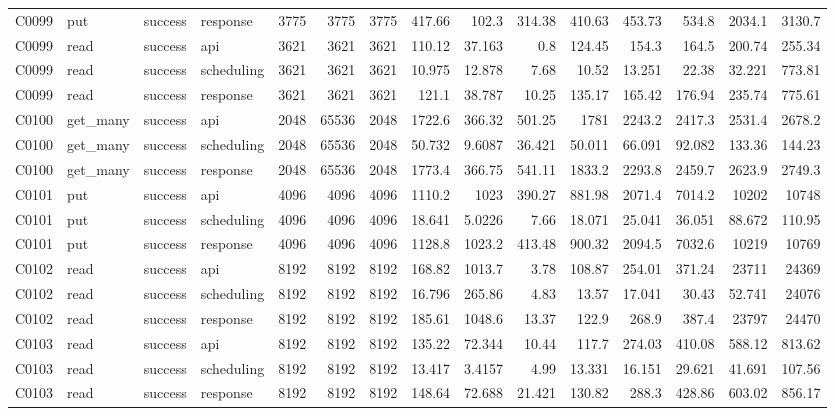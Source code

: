 \begin{landscape}
\begin{longtable}{llllrrrrrrrrrrr}
C0099 & put & success & response & 3775 & 3775 & 3775 & 417.66 & 102.3 & 314.38 & 410.63 & 453.73 & 534.8 & 2034.1 & 3130.7\\
C0099 & read & success & api & 3621 & 3621 & 3621 & 110.12 & 37.163 & 0.8 & 124.45 & 154.3 & 164.5 & 200.74 & 255.34\\
C0099 & read & success & scheduling & 3621 & 3621 & 3621 & 10.975 & 12.878 & 7.68 & 10.52 & 13.251 & 22.38 & 32.221 & 773.81\\
C0099 & read & success & response & 3621 & 3621 & 3621 & 121.1 & 38.787 & 10.25 & 135.17 & 165.42 & 176.94 & 235.74 & 775.61\\
C0100 & get\_\allowbreak{}many & success & api & 2048 & 65536 & 2048 & 1722.6 & 366.32 & 501.25 & 1781 & 2243.2 & 2417.3 & 2531.4 & 2678.2\\
C0100 & get\_\allowbreak{}many & success & scheduling & 2048 & 65536 & 2048 & 50.732 & 9.6087 & 36.421 & 50.011 & 66.091 & 92.082 & 133.36 & 144.23\\
C0100 & get\_\allowbreak{}many & success & response & 2048 & 65536 & 2048 & 1773.4 & 366.75 & 541.11 & 1833.2 & 2293.8 & 2459.7 & 2623.9 & 2749.3\\
C0101 & put & success & api & 4096 & 4096 & 4096 & 1110.2 & 1023 & 390.27 & 881.98 & 2071.4 & 7014.2 & 10202 & 10748\\
C0101 & put & success & scheduling & 4096 & 4096 & 4096 & 18.641 & 5.0226 & 7.66 & 18.071 & 25.041 & 36.051 & 88.672 & 110.95\\
C0101 & put & success & response & 4096 & 4096 & 4096 & 1128.8 & 1023.2 & 413.48 & 900.32 & 2094.5 & 7032.6 & 10219 & 10769\\
C0102 & read & success & api & 8192 & 8192 & 8192 & 168.82 & 1013.7 & 3.78 & 108.87 & 254.01 & 371.24 & 23711 & 24369\\
C0102 & read & success & scheduling & 8192 & 8192 & 8192 & 16.796 & 265.86 & 4.83 & 13.57 & 17.041 & 30.43 & 52.741 & 24076\\
C0102 & read & success & response & 8192 & 8192 & 8192 & 185.61 & 1048.6 & 13.37 & 122.9 & 268.9 & 387.4 & 23797 & 24470\\
C0103 & read & success & api & 8192 & 8192 & 8192 & 135.22 & 72.344 & 10.44 & 117.7 & 274.03 & 410.08 & 588.12 & 813.62\\
C0103 & read & success & scheduling & 8192 & 8192 & 8192 & 13.417 & 3.4157 & 4.99 & 13.331 & 16.151 & 29.621 & 41.691 & 107.56\\
C0103 & read & success & response & 8192 & 8192 & 8192 & 148.64 & 72.688 & 21.421 & 130.82 & 288.3 & 428.86 & 603.02 & 856.17\\

\end{longtable}
\end{landscape}
